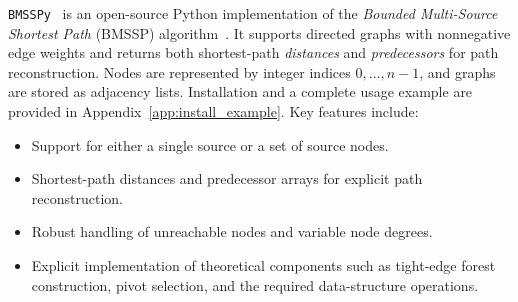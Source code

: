 \documentclass[ijoc,blindrev]{informs3} %
\begin{document}
\texttt{BMSSPy}~\citep{makowski_bmsspy_2025} is {\color{blue}an open-source Python implementation} of the \emph{Bounded Multi-Source Shortest Path} (BMSSP) algorithm~\citep{duan_breaking_2025}. It supports directed graphs with nonnegative edge weights and returns both shortest-path \emph{distances} and \emph{predecessors} for path reconstruction. {\color{blue}Nodes are represented by integer indices \(0,\ldots,n-1\), and graphs are stored as adjacency lists. Installation and a complete usage example are provided in Appendix~\ref{app:install_example}.} Key features include:
\begin{itemize}
\item Support for either a single source or a set of source nodes.
\item Shortest-path distances and predecessor arrays for explicit path reconstruction.
\item Robust handling of unreachable nodes and variable node degrees.
\item Explicit implementation of theoretical components such as tight-edge forest construction, pivot selection, and the required data-structure operations.
\end{itemize}
\end{document}
